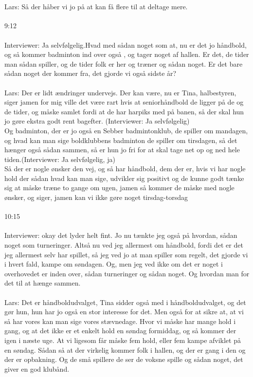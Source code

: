 \\\\
Lars: Så der håber vi jo på at kan få flere til at deltage mere.
\\\\
9:12 
\\\\
Interviewer: Ja selvfølgelig.Hvad med sådan noget som at, nu er det jo håndbold, og så kommer badminton ind over også , og tager noget af hallen. Er det, de tider man sådan spiller, og de tider folk er her og træner og sådan noget. Er det bare sådan noget der kommer fra, det gjorde vi også sidste år? 
\\\\
Lars: Der er lidt ændringer undervejs. Der kan være, nu er Tina, halbestyren, siger jamen for mig ville det være rart hvis at seniorhåndbold de ligger på de og de tider, og måske samlet fordi at de har harpiks med på banen, så der skal hun jo gøre ekstra godt rent bagefter. (Interviewer: Ja selvfølgelig)\\
Og badminton, der er jo også en Sebber badmintonklub, de spiller om mandagen, og hvad kan man sige boldklubbens badminton de spiller om tirsdagen, så det hænger også sådan sammen, så er hun jo fri for at skal tage net op og ned hele tiden.(Interviewer: Ja selvfølgelig, ja)\\
Så der er nogle ønsker den vej, og så har håndbold, dem der er, hvis vi har nogle hold der sådan hvad kan man sige, udvikler sig positivt og de kunne godt tænke sig at måske træne to gange om ugen, jamen så kommer de måske med nogle ønsker,  og siger, jamen kan vi ikke gøre noget tirsdag-torsdag
\\\\
10:15
\\\\
Interviewer: okay det lyder helt fint. Jo nu tænkte jeg også på hvordan, sådan noget som turneringer. Altså nu ved jeg allermest om håndbold, fordi det er det jeg allermest selv har spillet, så jeg ved jo at man spiller som regelt, det gjorde vi i hvert fald, kampe om søndagen. Og, men jeg ved ikke om det er noget i overhovedet er inden over, sådan turneringer og sådan noget. Og hvordan man for det til at hænge sammen. 
\\\\
Lars:  Det er håndboldudvalget, Tina sidder også med i håndboldudvalget, og det gør hun, hun har jo også en stor interesse for det. Men også for at sikre at, at vi så har vores kan man sige vores stævnedage. Hvor vi måske har mange hold i gang, og at det ikke er et enkelt hold en søndag formiddag, og så kommer der igen i næste uge. At vi ligesom får måske fem hold, eller fem kampe afviklet på en søndag. Sådan så at der virkelig kommer folk i hallen, og der er gang i den og der er opbakning. Og de små spillere de ser de voksne spille og sådan noget, det giver en god klubånd.
